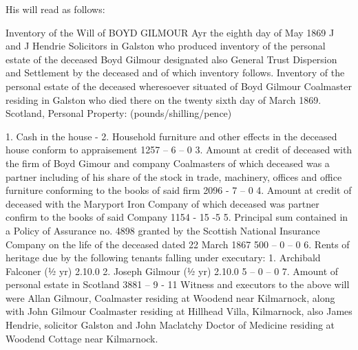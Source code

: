 His will read as follows:

Inventory of the Will of BOYD GILMOUR
    Ayr the eighth day of May 1869 J and J Hendrie Solicitors in Galston who produced inventory of the personal estate of the deceased Boyd Gilmour designated also General Trust Dispersion and Settlement by the deceased and of which inventory follows.
    Inventory of the personal estate of the deceased wheresoever situated of Boyd Gilmour Coalmaster residing in Galston who died there on the twenty sixth day of March 1869.
    Scotland, Personal Property:
    (pounds/shilling/pence)


    1. Cash in the house -
    2. Household furniture and other effects in the deceased house
    conform to appraisement 1257 – 6 – 0
    3. Amount at credit of deceased with the firm of Boyd Gimour and
    company Coalmasters of which deceased was a partner including
    of his share of the stock in trade, machinery, offices and office
    furniture conforming to the books of said firm 2096 - 7 – 0
    4. Amount at credit of deceased with the Maryport Iron Company
    of which deceased was partner confirm to the books of said
    Company 1154 - 15 -5
    5. Principal sum contained in a Policy of Assurance no. 4898
    granted by the Scottish National Insurance Company on the life
    of the deceased dated 22 March 1867 500 – 0 – 0
    6. Rents of heritage due by the following tenants falling under
    executary: 1. Archibald Falconer (½ yr) 2.10.0
    2. Joseph Gilmour (½ yr) 2.10.0 5 – 0 – 0
    7. Amount of personal estate in Scotland 3881 – 9 - 11 
    Witness and executors to the above will were Allan Gilmour, Coalmaster residing at Woodend near Kilmarnock, along with John Gilmour Coalmaster residing at Hillhead Villa, Kilmarnock, also James Hendrie, solicitor Galston and John Maclatchy Doctor of Medicine residing at Woodend Cottage near Kilmarnock.
